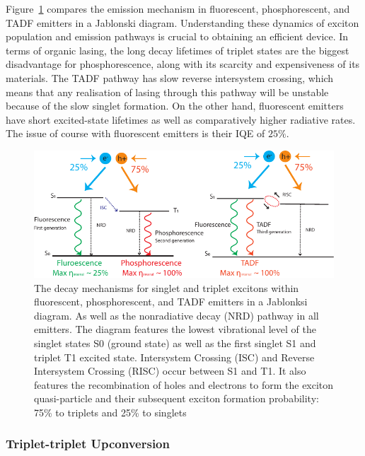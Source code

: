 \documentclass[
  letterpaper,
  DIV=11,
  numbers=noendperiod,
  oneside]{scrreprt}
\begin{document}
Figure~\ref{fig-emitters} compares the emission mechanism in
fluorescent, phosphorescent, and TADF emitters in a Jablonski diagram.
Understanding these dynamics of exciton population and emission pathways
is crucial to obtaining an efficient device. In terms of organic lasing,
the long decay lifetimes of triplet states are the biggest disadvantage
for phosphorescence, along with its scarcity and expensiveness of its
materials. The TADF pathway has slow reverse intersystem crossing, which
means that any realisation of lasing through this pathway will be
unstable because of the slow singlet formation. On the other hand,
fluorescent emitters have short excited-state lifetimes as well as
comparatively higher radiative rates. The issue of course with
fluorescent emitters is their IQE of \(25\%\).

\begin{figure}

{\centering \includegraphics{./images/emitters.pdf}

}

\caption{\label{fig-emitters}The decay mechanisms for singlet and
triplet excitons within fluorescent, phosphorescent, and TADF emitters
in a Jablonksi diagram. As well as the nonradiative decay (NRD) pathway
in all emitters. The diagram features the lowest vibrational level of
the singlet states {S0} (ground state) as well as the first singlet {S1}
and triplet {T1} excited state. Intersystem Crossing (ISC) and Reverse
Intersystem Crossing (RISC) occur between {S1} and {T1}. It also
features the recombination of holes and electrons to form the exciton
quasi-particle and their subsequent exciton formation probability:
{75\%} to triplets and {25\%} to singlets}

\end{figure}

\hypertarget{triplet-triplet-upconversion}{%
\subsubsection{Triplet-triplet
Upconversion}\label{triplet-triplet-upconversion}}
\end{document}
